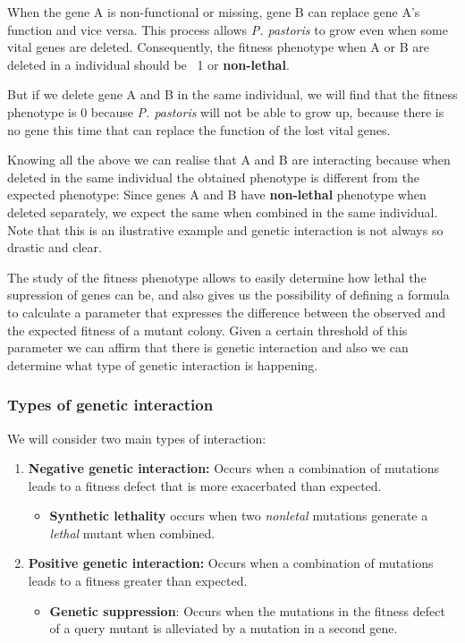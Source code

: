 \documentclass[11pt]{article}
\begin{document}
    \par
    When the gene A is non-functional or missing, gene B can replace gene A's function and vice versa. This process allows \textit{P. pastoris} to grow even when some vital genes are deleted. Consequently, the fitness phenotype when A or B are deleted in a individual should be ~1 or \textbf{non-lethal}.

    \par
    But if we delete gene A and B in the same individual, we will find that the fitness phenotype is 0 because \textit{P. pastoris} will not be able to grow up, because there is no gene this time that can replace the function of the lost vital genes.

    \par
    Knowing all the above we can realise that A and B are interacting because when deleted in the same individual the obtained phenotype is different from the expected phenotype: Since genes A and B have \textbf{non-lethal} phenotype when deleted separately, we expect the same when combined in the same individual. Note that this is an ilustrative example and genetic interaction is not always so drastic and clear.
    
    \par
    The study of the fitness phenotype allows to easily determine how lethal the supression of genes can be, and also gives us the possibility of defining a formula to calculate a parameter that expresses the difference between the observed and the expected fitness of a mutant colony. Given a certain threshold of this parameter we can affirm that there is genetic interaction and also we can determine what type of genetic interaction is happening. 

      \subsubsection{Types of genetic interaction}
      We will consider two main types of interaction:
      \begin{enumerate}
        \item \textbf{Negative genetic interaction:} Occurs when a combination of mutations leads to a fitness defect that is more exacerbated than expected. 
		\begin{itemize}
        \item \textbf{Synthetic lethality} occurs when two \textit{nonletal} mutations generate a \textit{lethal} mutant when combined.
        \end{itemize}

        \item \textbf{Positive genetic interaction:} Occurs when a combination of mutations leads to a fitness greater than expected. 
		\begin{itemize}
        \item \textbf{Genetic suppression}: Occurs when the mutations in the fitness defect of a query mutant is alleviated by a mutation in a second gene. 
        \end{itemize}
      \end{enumerate}
\end{document}
